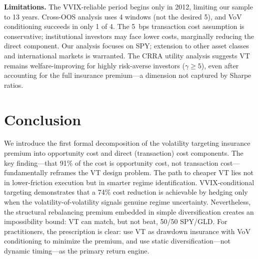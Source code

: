 \documentclass[12pt,a4paper]{article}
\begin{document}
\textbf{Limitations.} The VVIX-reliable period begins only in 2012, limiting our sample to 13 years. Cross-OOS analysis uses 4 windows (not the desired 5), and VoV conditioning succeeds in only 1 of 4. The 5~bps transaction cost assumption is conservative; institutional investors may face lower costs, marginally reducing the direct component. Our analysis focuses on SPY; extension to other asset classes and international markets is warranted. The CRRA utility analysis suggests VT remains welfare-improving for highly risk-averse investors ($\gamma \geq 5$), even after accounting for the full insurance premium---a dimension not captured by Sharpe ratios.

\section{Conclusion}
\label{sec:conclusion}

We introduce the first formal decomposition of the volatility targeting insurance premium into opportunity cost and direct (transaction) cost components. The key finding---that 91\% of the cost is opportunity cost, not transaction cost---fundamentally reframes the VT design problem. The path to cheaper VT lies not in lower-friction execution but in smarter regime identification. VVIX-conditional targeting demonstrates that a 74\% cost reduction is achievable by hedging only when the volatility-of-volatility signals genuine regime uncertainty. Nevertheless, the structural rebalancing premium embedded in simple diversification creates an impossibility bound: VT can match, but not beat, 50/50 SPY/GLD. For practitioners, the prescription is clear: use VT as drawdown insurance with VoV conditioning to minimize the premium, and use static diversification---not dynamic timing---as the primary return engine.
\end{document}

